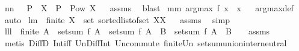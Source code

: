 \begin{isabellebody}
%
\isadelimproof
%
\endisadelimproof
\isanewline
\isanewline
{}\isamarkupfalse%
\ nn{}{}{\isacharcolon}\ \ {\isachardoublequoteopen}{\isasymUnion}\ P\ {\isacharequal}\ X{\isachardoublequoteclose}\ \ {\isachardoublequoteopen}P\ {\isasymsubseteq}\ Pow\ X{\isachardoublequoteclose}%
\isadelimproof
\ %
\endisadelimproof
%
\isatagproof
{}\isamarkupfalse%
\ assms\ \isamarkupfalse%
\ blast%
\endisatagproof
{\isafoldproof}%
%
\isadelimproof
%
\endisadelimproof
\isanewline
\isanewline
{}\isamarkupfalse%
\ mm{}{}{\isacharcolon}\ {\isachardoublequoteopen}argmax\ f\ {\isacharbraceleft}x{\isacharbraceright}\ {\isacharequal}\ {\isacharbraceleft}x{\isacharbraceright}{\isachardoublequoteclose}%
\isadelimproof
\ %
\endisadelimproof
%
\isatagproof
{}\isamarkupfalse%
\ argmax{\isacharunderscore}def\ \isamarkupfalse%
\ auto%
\endisatagproof
{\isafoldproof}%
%
\isadelimproof
%
\endisadelimproof
\isanewline
\isanewline
{}\isamarkupfalse%
\ lm{}{}{\isacharcolon}\ \ {\isachardoublequoteopen}finite\ X{\isachardoublequoteclose}\ \ {\isachardoublequoteopen}set\ {\isacharparenleft}sorted{\isacharunderscore}list{\isacharunderscore}of{\isacharunderscore}set\ X{\isacharparenright}{\isacharequal}X{\isachardoublequoteclose}%
\isadelimproof
\ %
\endisadelimproof
%
\isatagproof
{}\isamarkupfalse%
\ assms\ \isamarkupfalse%
\ simp%
\endisatagproof
{\isafoldproof}%
%
\isadelimproof
%
\endisadelimproof
\isanewline
\isanewline
{}\isamarkupfalse%
\ lll{}{}{\isacharcolon}\ \ {\isachardoublequoteopen}finite\ A{\isachardoublequoteclose}\ \ {\isachardoublequoteopen}setsum\ f\ A\ {\isacharequal}\ setsum\ f\ {\isacharparenleft}A\ {\isasyminter}\ B{\isacharparenright}\ {\isacharplus}\ setsum\ f\ {\isacharparenleft}A\ {\isacharminus}\ B{\isacharparenright}{\isachardoublequoteclose}%
\isadelimproof
\ %
\endisadelimproof
%
\isatagproof
{}\isamarkupfalse%
\ \isanewline
assms\ \isamarkupfalse%
\ {\isacharparenleft}metis\ DiffD{}\ Int{\isacharunderscore}iff\ Un{\isacharunderscore}Diff{\isacharunderscore}Int\ Un{\isacharunderscore}commute\ finite{\isacharunderscore}Un\ setsum{\isachardot}union{\isacharunderscore}inter{\isacharunderscore}neutral{\isacharparenright}%
\endisatagproof
{\isafoldproof}%
%
\isadelimproof

\end{isabellebody}
